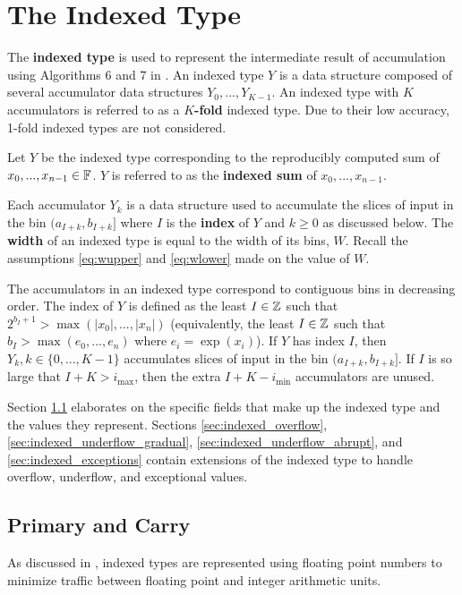 \section{The Indexed Type}
  \label{sec:indexed}
    The \textbf{indexed type} is used to represent the intermediate result of
    accumulation using Algorithms 6 and $7$ in \cite{repsum}.  An indexed type
    $Y$ is a data structure composed of several accumulator data structures
    $Y_0, ..., Y_{K - 1}$. An indexed type with $K$ accumulators is referred to
    as a \textbf{$K$-fold} indexed type. Due to their low accuracy, 1-fold
    indexed types are not considered.

    Let $Y$ be the indexed type corresponding to the reproducibly computed sum
    of $x_0, ..., x_{n - 1} \in \mathbb{F}$. $Y$ is referred to as the \textbf{indexed
    sum} of $x_0, ..., x_{n - 1}$.

    Each accumulator $Y_k$ is a data structure used to accumulate the slices of
    input in the bin $(a_{I + k}, b_{I + k}]$ where $I$ is the \textbf{index}
    of $Y$ and $k \geq 0$ as discussed below. The \textbf{width} of an indexed
    type is equal to the width of its bins, $W$. Recall the assumptions
    \eqref{eq:wupper} and \eqref{eq:wlower} made on the value of $W$.

    The accumulators in an indexed type correspond to contiguous bins in
    decreasing order. The index of $Y$ is defined as the least $I \in \mathbb{Z}$ such
    that $2^{b_I + 1} > \max(|x_0|, ..., |x_n|)$ (equivalently,
    the least $I \in \mathbb{Z}$ such that $b_I > \max(e_0, ..., e_n)$ where $e_i=\exp(x_i)$).
    If $Y$ has index $I$, then $Y_k, k \in \{0, ..., K - 1\}$ accumulates slices
    of input in the bin $(a_{I + k}, b_{I + k}]$. If $I$ is so large that
    $I + K > i_{\max}$, then the extra $I + K - i_{\min}$ accumulators are unused.

    Section \ref{sec:indexed_primary_carry} elaborates on the specific fields
    that make up the indexed type and the values they represent. Sections
    \ref{sec:indexed_overflow}, \ref{sec:indexed_underflow_gradual},
    \ref{sec:indexed_underflow_abrupt}, and \ref{sec:indexed_exceptions}
    contain extensions of the indexed type to handle overflow, underflow, and
    exceptional values.

    \subsection{Primary and Carry}
      \label{sec:indexed_primary_carry}
      As discussed in \cite{repsum}, indexed types are represented using
      floating point numbers to minimize traffic between floating point and
      integer arithmetic units.

